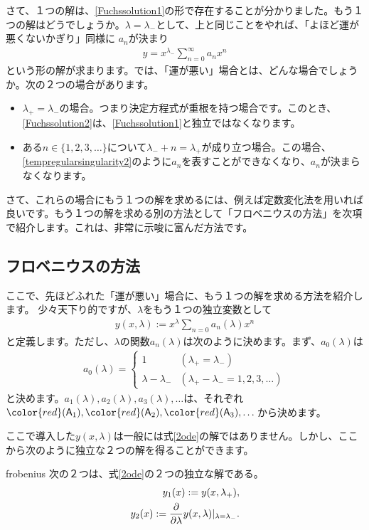 \documentclass[report,paper=a4, fontsize=12pt, line_length=16cm, number_of_lines=33,dvipdfmx]{jlreq}
\numberwithin{equation}{section}
\newcommand{\Atag}[1]{{\color{red} (\mathsf{A}_{#1})}}
\begin{document}
さて、１つの解は、\eqref{Fuchssolution1}の形で存在することが分かりました。もう１つの解はどうでしょうか。$\lambda=\lambda_{-}$として、上と同じことをやれば、「よほど運が悪くないかぎり」同様に
$a_n$が決まり
\begin{align}
  y=x^{\lambda_{-}}\sum_{n=0}^{\infty}a_{n}x^{n}
  \label{Fuchssolution2}
\end{align}
という形の解が求まります。では、「運が悪い」場合とは、どんな場合でしょうか。次の２つの場合があります。
\begin{itemize}
  \item $\lambda_{+}=\lambda_{-}$の場合。つまり決定方程式が重根を持つ場合です。このとき、\eqref{Fuchssolution2}は、\eqref{Fuchssolution1}と独立ではなくなります。
  \item ある$n\in \{1,2,3,\dots\}$について$\lambda_{-}+n=\lambda_{+}$が成り立つ場合。この場合、\eqref{tempregularsingularity2}のように$a_n$を表すことができなくなり、$a_n$が決まらなくなります。
\end{itemize}
さて、これらの場合にもう１つの解を求めるには、例えば定数変化法を用いれば良いです。もう１つの解を求める別の方法として「フロベニウスの方法」を次項で紹介します。これは、非常に示唆に富んだ方法です。

\subsection{フロベニウスの方法}
ここで、先ほどふれた「運が悪い」場合に、もう１つの解を求める方法を紹介します。
少々天下り的ですが、$\lambda$をもう１つの独立変数として
\begin{align}
  y(x,\lambda):=x^{\lambda}\sum_{n=0}a_n(\lambda)x^{n}
\end{align}
と定義します。ただし、$\lambda$の関数$a_n(\lambda)$は次のように決めます。まず、$a_0(\lambda)$は
\begin{align}
  a_0(\lambda)=
  \begin{cases}
    1& (\lambda_+=\lambda_-)\\
    \lambda-\lambda_{-} & (\lambda_{+}-\lambda_{-}=1,2,3,\dots)
  \end{cases}\label{frobeniuscoefficients}
\end{align}
と決めます。$a_1(\lambda),a_2(\lambda),a_3(\lambda),\dots$は、それぞれ$\Atag{1},\Atag{2},\Atag{3},\dots$から決めます。

ここで導入した$y(x,\lambda)$は一般には式\eqref{2ode}の解ではありません。しかし、ここから次のように独立な２つの解を得ることができます。
\begin{theor}{}{frobenius}
  次の２つは、式\eqref{2ode}の２つの独立な解である。
  \begin{align}
    y_1(x):=y(x,\lambda_{+}),\\
    y_2(x):=\pdv{\lambda}y(x,\lambda)|_{\lambda=\lambda_{-}}.
  \end{align}
\end{theor}
\end{document}
